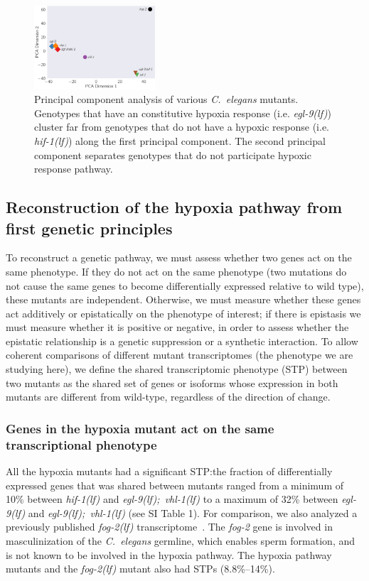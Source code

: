 \documentclass[9pt,twocolumn,twoside]{pnas-new}
\newcommand{\cel}{\emph{C.~elegans}}
\newcommand{\gene}[1]{\mbox{\emph{#1}}}
\newcommand{\fog}{\gene{fog-2(lf)}}
\newcommand{\egl}{\gene{egl-9(lf)}}
\newcommand{\eglvhl}{\gene{egl-9(lf); vhl-1(lf)}}
\newcommand{\hif}{\gene{hif-1(lf)}}
\begin{document}
\begin{figure}[tbhp]
  \centering
  \includegraphics[width=0.4\textwidth]{../figs/pca.pdf}
  \caption{
    Principal component analysis of various \cel{} mutants. Genotypes that have
    an constitutive hypoxia response (i.e. \egl{}) cluster far from genotypes
    that do not have a hypoxic response (i.e. \hif{}) along the first principal
    component. The second principal component separates genotypes that do not
    participate hypoxic response pathway.
  }
\label{fig:pca}
\end{figure}

\subsection*{Reconstruction of the hypoxia pathway from first genetic principles}
\label{sec:reconstruct}
To reconstruct a genetic pathway, we must assess whether two genes act on
the same phenotype. If they do not act on the same phenotype (two mutations do
not cause the same genes to become differentially expressed relative to
wild type), these mutants are independent. Otherwise, we must measure whether
these genes act additively or epistatically on the phenotype of interest; if
there is epistasis we must measure whether it is positive or negative, in order
to assess whether the epistatic relationship is a genetic suppression or a
synthetic interaction. To allow coherent comparisons of different mutant
transcriptomes (the phenotype we are studying here), we define the shared
transcriptomic phenotype (STP) between two mutants as the shared set of genes or
isoforms whose expression in both mutants are different from wild-type,
regardless of the direction of change.

\subsubsection*{Genes in the hypoxia mutant act on the same transcriptional
                phenotype}
\label{sec:phenotypes}
All the hypoxia mutants had a significant STP:\@ the fraction of differentially
expressed genes that was shared between mutants ranged from a minimum of 10\%
between \hif{} and \eglvhl{} to a maximum of 32\% between \egl{} and \eglvhl{}
(see SI Table 1).
For comparison, we also analyzed a previously published \fog{}
transcriptome~\cite{Angeles-Albores2017a}. The \gene{fog-2} gene is involved in
masculinization of the \cel{} germline, which enables sperm formation, and is
not known to be involved in the hypoxia pathway. The hypoxia pathway mutants and
the \fog{} mutant also had STPs (8.8\%--14\%).
\end{document}
